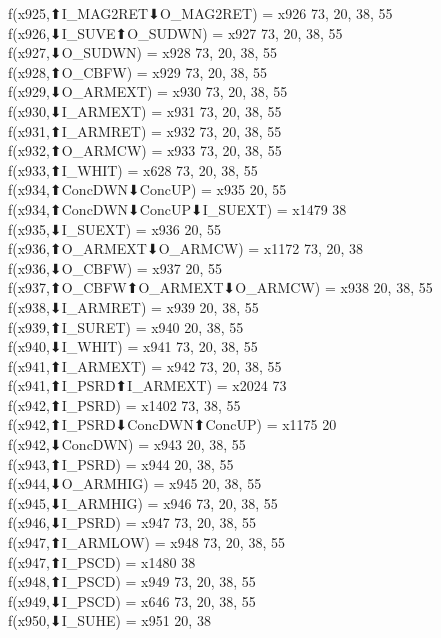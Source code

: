 f(x925,⬆I_MAG2RET⬇O_MAG2RET) = x926 {73, 20, 38, 55} \\
f(x926,⬇I_SUVE⬆O_SUDWN) = x927 {73, 20, 38, 55} \\
f(x927,⬇O_SUDWN) = x928 {73, 20, 38, 55} \\
f(x928,⬆O_CBFW) = x929 {73, 20, 38, 55} \\
f(x929,⬇O_ARMEXT) = x930 {73, 20, 38, 55} \\
f(x930,⬇I_ARMEXT) = x931 {73, 20, 38, 55} \\
f(x931,⬆I_ARMRET) = x932 {73, 20, 38, 55} \\
f(x932,⬆O_ARMCW) = x933 {73, 20, 38, 55} \\
f(x933,⬆I_WHIT) = x628 {73, 20, 38, 55} \\
f(x934,⬆ConcDWN⬇ConcUP) = x935 {20, 55} \\
f(x934,⬆ConcDWN⬇ConcUP⬇I_SUEXT) = x1479 {38} \\
f(x935,⬇I_SUEXT) = x936 {20, 55} \\
f(x936,⬆O_ARMEXT⬇O_ARMCW) = x1172 {73, 20, 38} \\
f(x936,⬇O_CBFW) = x937 {20, 55} \\
f(x937,⬆O_CBFW⬆O_ARMEXT⬇O_ARMCW) = x938 {20, 38, 55} \\
f(x938,⬇I_ARMRET) = x939 {20, 38, 55} \\
f(x939,⬆I_SURET) = x940 {20, 38, 55} \\
f(x940,⬇I_WHIT) = x941 {73, 20, 38, 55} \\
f(x941,⬆I_ARMEXT) = x942 {73, 20, 38, 55} \\
f(x941,⬆I_PSRD⬆I_ARMEXT) = x2024 {73} \\
f(x942,⬆I_PSRD) = x1402 {73, 38, 55} \\
f(x942,⬆I_PSRD⬇ConcDWN⬆ConcUP) = x1175 {20} \\
f(x942,⬇ConcDWN) = x943 {20, 38, 55} \\
f(x943,⬆I_PSRD) = x944 {20, 38, 55} \\
f(x944,⬇O_ARMHIG) = x945 {20, 38, 55} \\
f(x945,⬇I_ARMHIG) = x946 {73, 20, 38, 55} \\
f(x946,⬇I_PSRD) = x947 {73, 20, 38, 55} \\
f(x947,⬆I_ARMLOW) = x948 {73, 20, 38, 55} \\
f(x947,⬆I_PSCD) = x1480 {38} \\
f(x948,⬆I_PSCD) = x949 {73, 20, 38, 55} \\
f(x949,⬇I_PSCD) = x646 {73, 20, 38, 55} \\
f(x950,⬇I_SUHE) = x951 {20, 38} \\
